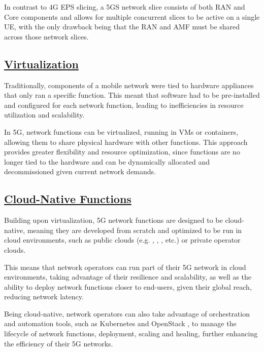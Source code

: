 In contrast to 4G EPS slicing, a 5GS network slice consists of both \gls{RAN} and Core components and allows for multiple concurrent slices to be active on a single \gls{UE}, with the only drawback being that the \gls{RAN} and \gls{AMF} must be shared across those network slices. 
\subsection*{\normalfont\uline{Virtualization}}
\label{sec:virtualization}
Traditionally, components of a mobile network were tied to hardware appliances that only ran a specific function. This meant that software had to be pre-installed and configured for each network function, leading to inefficiencies in resource utilization and scalability.

In 5G, network functions can be virtualized, running in \glspl{VM} or containers, allowing them to share physical hardware with other functions. This approach provides greater flexibility and resource optimization, since functions are no longer tied to the hardware and can be dynamically allocated and decommissioned given current network demands. 
\subsection*{\normalfont\uline{Cloud-Native Functions}}
\label{sec:cloud-native_functions}
Building upon virtualization, 5G network functions are designed to be cloud-native, meaning they are developed from scratch and optimized to be run in cloud environments, such as public clouds (e.g. , , , etc.) or private operator clouds. 

This means that network operators can run part of their 5G network in cloud environments, taking advantage of their resilience and scalability, as well as the ability to deploy network functions closer to end-users, given their global reach, reducing network latency.

Being cloud-native, network operators can also take advantage of orchestration and automation tools, such as Kubernetes and OpenStack \cite{mamushiane2023deploying}, to manage the lifecycle of network functions, deployment, scaling and healing, further enhancing the efficiency of their 5G networks.
